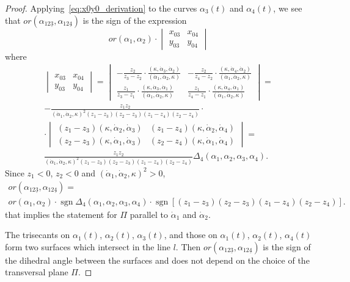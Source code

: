 \documentclass[10pt,a4paper]{amsart}
\DeclareMathOperator{\sgn}{\mathrm{sgn}}
\begin{document}
\begin{proof}
Applying~\eqref{eq:x0y0_derivation} to the curves $\alpha_3(t)$ and $\alpha_4(t)$, we see that $or(\alpha_{12\underline{3}},\alpha_{12\underline{4}})$ is the sign of the expression
\[
or(\alpha_1,\alpha_2)\cdot\begin{vmatrix}
                                 x_{03} & x_{04}\\ y_{03} & y_{04}
                             \end{vmatrix}
\]
where
\begin{multline*}
\begin{vmatrix}
x_{03} & x_{04}\\ y_{03} & y_{04}
\end{vmatrix}=
\begin{vmatrix}
   -\frac{z_2}{z_3-z_2}\cdot\frac{(\kappa,\dot\alpha_3,\dot\alpha_2)}{(\dot\alpha_1,\dot\alpha_2,\kappa)} & -\frac{z_2}{z_4-z_2}\cdot\frac{(\kappa,\dot\alpha_4,\dot\alpha_2)}{(\dot\alpha_1,\dot\alpha_2,\kappa)} \\
  \frac{z_1}{z_3-z_1}\cdot\frac{(\kappa,\dot\alpha_3,\dot\alpha_1)}{(\dot\alpha_1,\dot\alpha_2,\kappa)} & \frac{z_1}{z_4-z_1}\cdot\frac{(\kappa,\dot\alpha_4,\dot\alpha_1)}{(\dot\alpha_1,\dot\alpha_2,\kappa)}
\end{vmatrix}=\\
-\frac{z_1z_2}{(\dot\alpha_1,\dot\alpha_2,\kappa)^2(z_1-z_3)(z_2-z_3)(z_1-z_4)(z_2-z_4)}\cdot\\
\cdot\begin{vmatrix}
   (z_1-z_3)(\kappa,\dot\alpha_2,\dot\alpha_3) & (z_1-z_4)(\kappa,\dot\alpha_2,\dot\alpha_4) \\
  (z_2-z_3)(\kappa,\dot\alpha_1,\dot\alpha_3) & (z_2-z_4)(\kappa,\dot\alpha_1,\dot\alpha_4)
\end{vmatrix}=\\
\frac{z_1z_2}{(\dot\alpha_1,\dot\alpha_2,\kappa)^2(z_1-z_3)(z_2-z_3)(z_1-z_4)(z_2-z_4)}\Delta_4(\alpha_1,\alpha_2,\alpha_3,\alpha_4).
\end{multline*}
Since $z_1<0$,  $z_2<0$ and $(\dot\alpha_1,\dot\alpha_2,\kappa)^2>0$,
\begin{multline*}
or(\alpha_{12\underline{3}},\alpha_{12\underline{4}})=\\
or(\alpha_1,\alpha_2)\cdot\sgn\Delta_4(\alpha_1,\alpha_2,\alpha_3,\alpha_4)
\cdot\sgn[(z_1-z_3)(z_2-z_3)(z_1-z_4)(z_2-z_4)].
\end{multline*}
that implies the statement for $\Pi$ parallel to $\dot\alpha_1$ and $\dot\alpha_2$.

The trisecants on $\alpha_1(t)$, $\alpha_2(t)$, $\alpha_3(t)$, and those on $\alpha_1(t)$, $\alpha_2(t)$, $\alpha_4(t)$ form two surfaces which intersect in the line $l$. Then $or(\alpha_{12\underline{3}},\alpha_{12\underline{4}})$ is the sign of the dihedral angle between the surfaces and does not depend on the choice of the transversal plane $\Pi$.
\end{proof}
\end{document}
